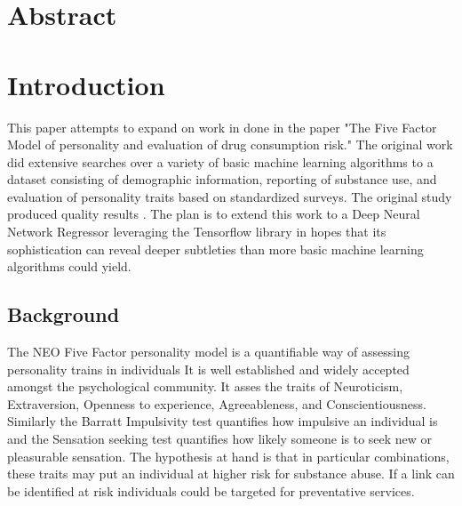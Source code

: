 \documentclass[12pt]{article}
\begin{document}
	\maketitle
	
	\clearpage
	
	\begin{flushleft}
		\section{Abstract}
		
		\section{Introduction}
		This paper attempts to expand on work in done in the paper "The Five Factor Model of personality and evaluation of drug consumption risk." The original work did extensive searches over a variety of basic machine learning algorithms to a dataset consisting of demographic information, reporting of substance use, and evaluation of personality traits based on standardized surveys. The original study produced quality results . The plan is to extend this work to a Deep Neural Network Regressor leveraging the Tensorflow library in hopes that its sophistication can reveal deeper subtleties than more basic machine learning algorithms could yield.\\
		
		\subsection{Background}
		The NEO Five Factor personality model is a quantifiable way of  assessing personality trains in individuals It is well established and widely accepted amongst the psychological community. It asses the traits of Neuroticism, Extraversion, Openness to experience, Agreeableness, and Conscientiousness.~\cite{doi:10.1177/1088868310366253} Similarly the Barratt Impulsivity test quantifies how impulsive an individual is and the Sensation seeking test quantifies how likely someone is to seek new or pleasurable sensation. The hypothesis at hand is that in particular combinations, these traits may put an individual at higher risk for substance abuse. If a link can be identified at risk individuals could be targeted for preventative services.\\
		

\end{flushleft}
\end{document}
